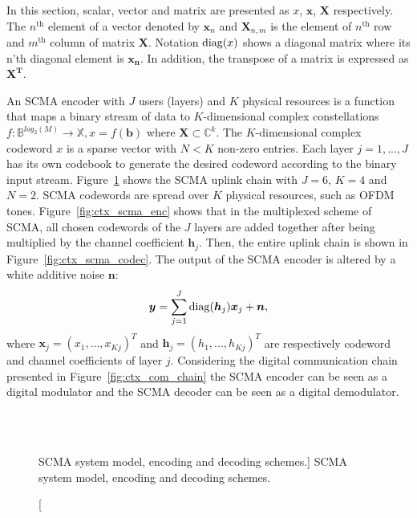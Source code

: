 In this section, scalar, vector and matrix are presented as $x$, $\bm{x}$,
$\bm{X}$ respectively. The $n^\text{th}$ element of a vector denoted by
$\bm{x}_n$ and $\bm{X}_{n,m}$ is the element of $n^\text{th}$ row and
$m^\text{th}$ column of matrix $\bm{X}$. Notation $\operatorname{diag}(x)$ shows a diagonal
matrix where its n'th diagonal element is $\bm{x_n}$. In addition, the transpose
of a matrix is expressed as $\bm{X^T}$.

An SCMA encoder with $J$ users (layers) and $K$ physical resources is a function
that maps a binary stream of data to $K$-dimensional complex constellations
$f : \mathbb{B}^{log_{2}(M)} \rightarrow \mathbb{X}, x = f(\bm{b})$ where
$\bm{X} \subset \mathbb{C}^k$. The $K$-dimensional complex codeword $x$ is a
sparse vector with $N < K$ non-zero entries. Each layer $j=1, ..., J$ has its
own codebook to generate the desired codeword according to the binary input
stream. Figure~\ref{fig:ctx_scma} shows the SCMA uplink chain with $J = 6$,
$K = 4$ and $N = 2$. SCMA codewords are spread over $K$ physical resources, such
as OFDM tones. Figure~\ref{fig:ctx_scma_enc} shows that in the multiplexed
scheme of SCMA, all chosen codewords of the $J$ layers are added together after
being multiplied by the channel coefficient $\bm{h}_j$. Then, the entire uplink
chain is shown in Figure~\ref{fig:ctx_scma_codec}. The output of the SCMA
encoder is altered by a white additive noise $\bm{n}$:
\begin{equation}
  \label{eq:ctx_scma_1}
  \bm{y} = \sum\limits_{j=1}^J \operatorname{diag}(\bm{h}_j)\bm{x}_j+\bm{n},
\end{equation}
where $\bm{x}_j=(x_1,...,x_{Kj})^T$ and $\bm{h}_j=(h_1,...,h_{Kj})^T$ are
respectively codeword and channel coefficients of layer $j$.
Considering the digital communication chain presented in
Figure~\ref{fig:ctx_com_chain} the SCMA encoder can be seen as a digital
modulator and the SCMA decoder can be seen as a digital demodulator.

\begin{figure}%
  \centering
  \\
  \\
  \quad
  \caption
    [SCMA system model, encoding and decoding schemes.]
    {SCMA system model, encoding and decoding schemes.}
  \label{fig:ctx_scma}
\end{figure}

